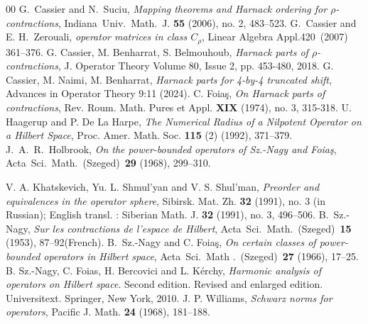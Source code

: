 \documentclass[12pt, reqno]{amsart}
\theoremstyle{definition}
\theoremstyle{remark}
\numberwithin{equation}{section}
\begin{document}
\begin{thebibliography}{00}
%
G.~Cassier and N.~Suciu, 
\textit{ Mapping theorems and Harnack ordering for $\rho$-contractions},   
Indiana\ Univ.\ Math.\ J. \textbf{55} (2006), no. 2, 483--523.
 G.~Cassier and E. H.~Zerouali, 
{\emph{operator matrices in class  $C_\rho$}},
Linear Algebra Appl.420\  (2007) 361--376.
 G. Cassier, M. Benharrat, S. Belmouhoub,
{\textit{ Harnack parts of $\rho$-contractions}},
J. Operator Theory  Volume 80, Issue 2,   pp. 453-480, 2018.
 G. Cassier, M. Naimi, M. Benharrat, 
{\textit{Harnack parts for 4-by-4 truncated shift}},
Advances in Operator Theory 9:11 (2024). 
  C. Foia\c{s}, 
\textit{ On Harnack parts of contractions}, 
Rev. Roum. Math. Pures et Appl. \textbf{ XIX} (1974), no. 3, 315-318.
%
 U. Haagerup and  P. De La Harpe, \textit{The Numerical Radius of a Nilpotent Operator on a Hilbert Space}, Proc. Amer. Math. Soc. \textbf{115} (2) (1992), 371--379.
%
 J.~A.~R.~Holbrook, 
\textit{ On the power-bounded operators of Sz.-Nagy and Foia\c{s}},
Acta\ Sci.\ Math.\ (Szeged)\  \textbf{29} (1968), 299--310.

V. A. Khatskevich, Yu. L. Shmul'yan and V. S. Shul'man, 
\textit{ Preorder and equivalences in the operator sphere},
Sibirsk. Mat. Zh. \textbf{32} (1991), no. 3 (in Russian); English transl. : Siberian Math. J. \textbf{32} (1991), no. 3, 496--506.
%
%
 B.~Sz.-Nagy, 
\textit{ Sur les contractions de l'espace de Hilbert},  
Acta\ Sci.\ Math.\ (Szeged)\  \textbf{15} (1953), 87--92(French).
%
 B.~Sz.-Nagy and C. Foia\c{s}, 
\textit{ On certain classes of power-bounded operators in Hilbert space}, 
Acta\ Sci.\ Math  .\ (Szeged)\  \textbf{27} (1966), 17--25.
%
B. Sz.-Nagy, C. Foias, H. Bercovici and L. K\'erchy,
\textit{ Harmonic analysis of operators on Hilbert space}.
Second edition. Revised and enlarged edition. Universitext. Springer, New York, 2010.
%
J. P. Williams,
\textit{ Schwarz norms for operators}, 
Pacific J. Math.  \textbf{24} (1968), 181--188.
%

\end{thebibliography}
\end{document}
